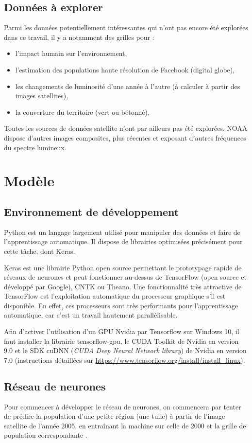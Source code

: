 \documentclass[a4paper, 11pt]{report}
\begin{document}
\section{Données à explorer}
Parmi les données potentiellement intéressantes qui n'ont pas encore été explorées dans ce travail, il y a notamment des grilles pour :
\begin{itemize}
	\item l'impact humain sur l'environnement,
	\item l'estimation des populations haute résolution de Facebook (digital globe),
	\item les changements de luminosité d'une année à l'autre (à calculer à partir des images satellites),
	\item la couverture du territoire (vert ou bétonné),
\end{itemize}
Toutes les sources de données satellite n'ont par ailleurs pas été explorées. NOAA dispose d'autres images composites, plus récentes et exposant d'autres fréquences du spectre lumineux.

\chapter{Modèle}
\section{Environnement de développement}
Python est un langage largement utilisé pour manipuler des données et faire de l'apprentissage automatique. Il dispose de librairies optimisées précisément pour cette tâche, dont Keras.

Keras est une librairie Python open source permettant le prototypage rapide de réseaux de neurones et peut fonctionner au-dessus de TensorFlow (open source et développé par Google), CNTK ou Theano. Une fonctionnalité très attractive de TensorFlow est l'exploitation automatique du processeur graphique s'il est disponible. En effet, ces processeurs sont très performants pour l'apprentissage automatique, car c'est un travail hautement parallélisable.

Afin d'activer l'utilisation d'un GPU Nvidia par Tensorflow sur Windows 10, il faut installer la librairie tensorflow-gpu, le CUDA Toolkit de Nvidia en version 9.0 et le SDK cuDNN (\textit{CUDA Deep Neural Network library}) de Nvidia en version 7.0 (instructions détaillées sur \url{https://www.tensorflow.org/install/install_linux}).

\section{Réseau de neurones}
Pour commencer à développer le réseau de neurones, on commencera par tenter de prédire la population d'une petite région (une tuile) à partir de l'image satellite de l'année 2005, en entraînant la machine sur celle de 2000 et la grille de population correspondante \cite{sedac}.
\end{document}
